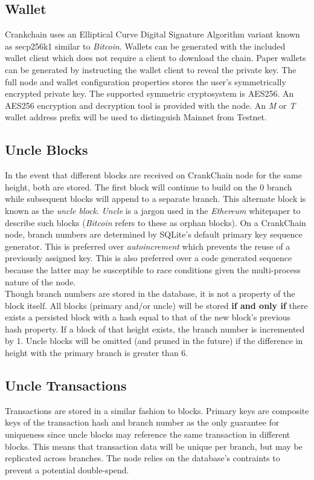 \documentclass[10pt,twocolumn]{article}
\begin{document}
\subsection{Wallet}
Crankchain uses an Elliptical Curve Digital Signature Algorithm variant known as secp256k1 similar to \textit{Bitcoin}\cite{btcwiki:secp256k1}. Wallets can be generated with the included wallet client which does not require a client to download the chain.  Paper wallets can be generated by instructing the wallet client to reveal the private key.  The full node and wallet configuration properties stores the user's symmetrically encrypted private key.  The supported symmetric cryptosystem is AES256\cite{pub:aes}.  An AES256 encryption and decryption tool is provided with the node.  An \textit{M} or \textit{T} wallet address prefix will be used to distinguish Mainnet from Testnet.
\subsection{Uncle Blocks}
In the event that different blocks are received on  CrankChain node for the same height, both are stored.  The first block will continue to build on the 0 branch while subsequent blocks will append to a separate branch.  This alternate block is known as the \textit{uncle block}.  \textit{Uncle} is a jargon used in the \textit{Ethereum} whitepaper to describe such blocks (\textit{Bitcoin} refers to these as orphan blocks)\cite{whitepaper:buterin}\cite{conf:nakamoto}.  On a CrankChain node, branch numbers are determined by SQLite's default primary key sequence generator.  This is preferred over \textit{autoincrement} which prevents the reuse of a previously assigned key\cite{doc:sqliteautoinc}.  This is also preferred over a code generated sequence because the latter may be susceptible to race conditions given the multi-process nature of the node.\\
Though branch numbers are stored in the database, it is not a property of the block itself.  All blocks (primary and/or uncle) will be stored \textbf{if and only if} there exists a persisted block with a hash equal to that of the new block's previous hash property.  If a block of that height exists, the branch number is incremented by 1.  Uncle blocks will be omitted (and pruned in the future) if the difference in height with the primary branch is greater than 6.
\subsection{Uncle Transactions}
Transactions are stored in a similar fashion to blocks.  Primary keys are composite keys of the transaction hash and branch number as the only guarantee for uniqueness since uncle blocks may reference the same transaction in different blocks.  This means that transaction data will be unique per branch, but may be replicated across branches.  The node relies on the database's contraints to prevent a potential double-spend.
\end{document}
